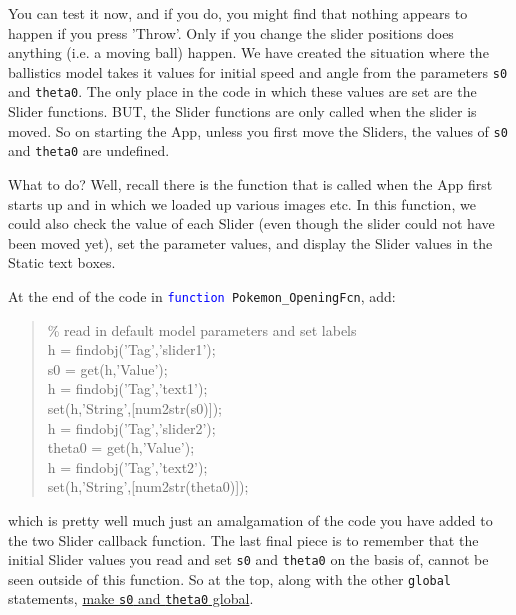 \documentclass{tufte-book} %
\newenvironment{docspec}{\begin{quotation}\ttfamily\parskip0pt\parindent0pt\ignorespaces}{\end{quotation}}
\begin{document}
You can test it now, and if you do, you might find that nothing appears to happen if you press 'Throw'. Only if you change the slider positions does anything (i.e. a moving ball) happen. We have created the situation where the ballistics model takes it values for initial speed and angle from the parameters \texttt{s0} and \texttt{theta0}. The only place in the code in which these values are set are the \textsf{Slider} functions. BUT, the \textsf{Slider} functions are only called when the slider is moved. So on starting the App, unless you first move the \textsf{Sliders}, the values of \texttt{s0} and \texttt{theta0} are undefined.

What to do? Well, recall there is the function that is called when the App first starts up and in which we loaded up various images etc. In this function, we could also check the value of each \textsf{Slider} (even though the slider could not have been moved yet), set the parameter values, and display the \textsf{Slider} values in the \textsf{Static text} boxes.

At the end of the code in \texttt{\textcolor{blue}{function} Pokemon\_OpeningFcn}, add:
\begin{docspec}
\textcolor[rgb]{0,0.501961,0}{\% read in default model parameters and set labels}
\\h = findobj(\textcolor[rgb]{0.501961,0,1}{'Tag'},\textcolor[rgb]{0.501961,0,1}{'slider1'});
\\s0 = get(h,\textcolor[rgb]{0.501961,0,1}{'Value'});
\\h = findobj(\textcolor[rgb]{0.501961,0,1}{'Tag'},\textcolor[rgb]{0.501961,0,1}{'text1'});
\\set(h,\textcolor[rgb]{0.501961,0,1}{'String'},[num2str(s0)]);
\\h = findobj(\textcolor[rgb]{0.501961,0,1}{'Tag'},\textcolor[rgb]{0.501961,0,1}{'slider2'});
\\theta0 = get(h,\textcolor[rgb]{0.501961,0,1}{'Value'});
\\h = findobj(\textcolor[rgb]{0.501961,0,1}{'Tag'},\textcolor[rgb]{0.501961,0,1}{'text2'});
\\set(h,\textcolor[rgb]{0.501961,0,1}{'String'},[num2str(theta0)]);
\end{docspec}
which is pretty well much just an amalgamation of the code you have added to the two \textsf{Slider} callback function. The last final piece is to remember that the initial Slider values you read and set \texttt{s0} and \texttt{theta0} on the basis of, cannot be seen outside of this function. So at the top, along with the other \texttt{global} statements, \uline{make \texttt{s0} and \texttt{theta0} global}.
\end{document}
